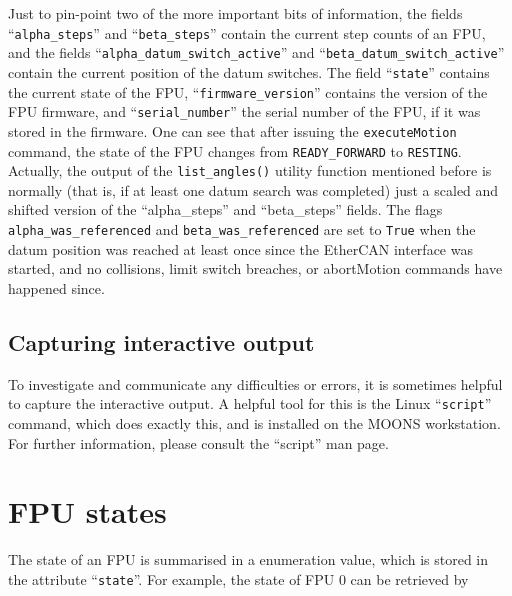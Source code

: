 \documentclass[fontsize=12,a4paper]{scrreprt}
\begin{document}
\begin{sloppypar}
Just to pin-point two of the more important bits of information, the
fields ``\texttt{alpha\_steps}'' and ``\texttt{beta\_steps}'' contain
the current step counts of an FPU, and the fields
``\texttt{alpha\_datum\_switch\_active}'' and
``\texttt{beta\_datum\_switch\_active}'' contain the current position
of the datum switches. The field ``\texttt{state}'' contains the
current state of the FPU, ``\texttt{firmware\_version}'' contains the
version of the FPU firmware, and ``\texttt{serial\_number}'' the
serial number of the FPU, if it was stored in the firmware. One can
see that after issuing the \texttt{executeMotion} command, the state
of the FPU changes from \texttt{READY\_FORWARD} to
\texttt{RESTING}. Actually, the output of the \texttt{list\_angles()}
utility function mentioned before is normally (that is, if at least
one datum search was completed) just a scaled and shifted version of
the ``alpha\_steps'' and ``beta\_steps'' fields. The flags
\texttt{alpha\_was\_referenced} and \texttt{beta\_was\_referenced} are set to
\texttt{True} when the datum position was reached at least once since
the EtherCAN interface was started, and no collisions, limit switch breaches, or
abortMotion commands have happened since.
\end{sloppypar}

\subsection*{Capturing interactive output}
  To
investigate and communicate any difficulties or errors, it is
sometimes helpful to capture the interactive output. A helpful tool
for this is the Linux ``\texttt{script}'' command, which does exactly
this, and is installed on the MOONS workstation.  For further
information, please consult the ``script'' man page.



\section{FPU states}
\label{sec:fpu_states}
%
%
%
%
%
%
%
The state of an
FPU is summarised in a enumeration value, which is stored in the
attribute ``\texttt{state}''. For example, the state of FPU 0 can be
retrieved by
\end{document}
